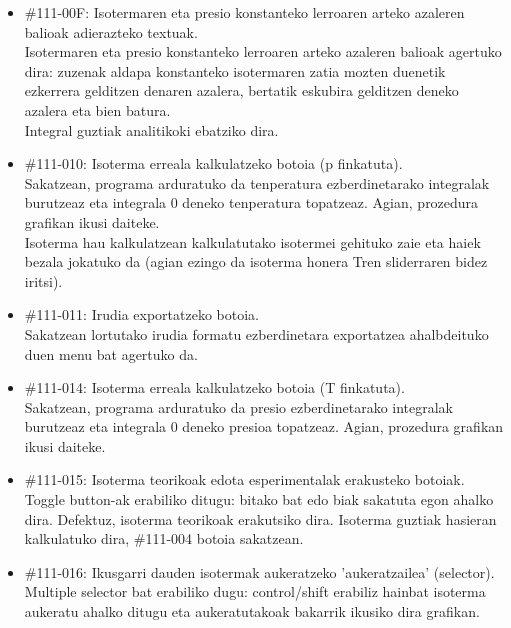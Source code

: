 \documentclass[10pt,a4paper]{article}
\let\nf\normalfont %
\newcommand{\cf}{\normalfont\sffamily}
\begin{document}
\begin{itemize}
\item \cf \#111-00F: Isotermaren eta presio konstanteko lerroaren arteko azaleren balioak adierazteko textuak.
\\
\nf Isotermaren eta presio konstanteko lerroaren arteko azaleren balioak agertuko dira: zuzenak aldapa konstanteko isotermaren zatia mozten duenetik ezkerrera gelditzen denaren azalera, bertatik eskubira gelditzen deneko azalera eta bien batura.
\\

Integral guztiak analitikoki ebatziko dira.
\\

\item \cf \#111-010: Isoterma erreala kalkulatzeko botoia (p finkatuta).
\\
\nf Sakatzean, programa arduratuko da tenperatura ezberdinetarako integralak burutzeaz eta integrala 0 deneko tenperatura topatzeaz. Agian, prozedura grafikan ikusi daiteke.
\\

Isoterma hau kalkulatzean kalkulatutako isotermei gehituko zaie eta haiek bezala jokatuko da (agian ezingo da isoterma honera Tren sliderraren bidez iritsi).


\item \cf \#111-011: Irudia exportatzeko botoia.
\\
\nf Sakatzean lortutako irudia formatu ezberdinetara exportatzea ahalbdeituko duen menu bat agertuko da.

\item \cf \#111-014: Isoterma erreala kalkulatzeko botoia (T finkatuta).
\\
\nf Sakatzean, programa arduratuko da presio ezberdinetarako integralak burutzeaz eta integrala 0 deneko presioa topatzeaz. Agian, prozedura grafikan ikusi daiteke.

\item \cf \#111-015: Isoterma teorikoak edota esperimentalak erakusteko botoiak.
\\
\nf Toggle button-ak erabiliko ditugu: bitako bat edo biak sakatuta egon ahalko dira. Defektuz, isoterma teorikoak erakutsiko dira. Isoterma guztiak hasieran kalkulatuko dira, \cf \#111-004 \nf botoia sakatzean.

\item \cf \#111-016: Ikusgarri dauden isotermak aukeratzeko 'aukeratzailea' (selector).
\\
\nf Multiple selector bat erabiliko dugu: control/shift erabiliz hainbat isoterma aukeratu ahalko ditugu eta aukeratutakoak bakarrik ikusiko dira grafikan.


\end{itemize}
\end{document}

